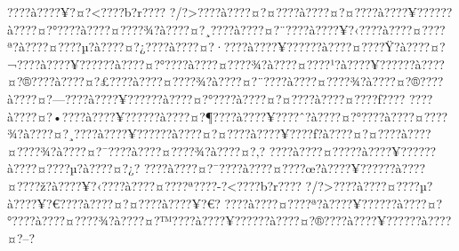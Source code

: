 \documentclass[11pt, openany]{book}
\begin{document}
{{{{{{{{{{{{{{{{{{{{{{{{{{{{{{{{{{{{{{{{{{{{{{{{{{{{{{{{{{{{{{{{{{{{{{{{{{{{{{{{{{{{{{{{{{{{{{{{{{{{{{{{{{{{{???\textbar{}?à???\textbar{}?¥?¤?\textless{}???\textbar{}?b?r???\textbar{}?
?/?\textgreater{}???\textbar{}?à???\textbar{}?¤?¤???\textbar{}?à???\textbar{}?¤?¤???\textbar{}?à???\textbar{}?¥?????\textbar{}?à???\textbar{}?¤?°???\textbar{}?à???\textbar{}?¤???\textbar{}?¾?à???\textbar{}?¤?¸???\textbar{}?à???\textbar{}?¤?¨???\textbar{}?à???\textbar{}?¥?‹???\textbar{}?à???\textbar{}?¤???\textbar{}?ª?à???\textbar{}?¤???\textbar{}?µ?à???\textbar{}?¤?¿???\textbar{}?à???\textbar{}?¤?·???\textbar{}?à???\textbar{}?¥?????\textbar{}?à???\textbar{}?¤???\textbar{}?Ÿ?à???\textbar{}?¤?¬???\textbar{}?à???\textbar{}?¥?????\textbar{}?à???\textbar{}?¤?°???\textbar{}?à???\textbar{}?¤???\textbar{}?¾?à???\textbar{}?¤???\textbar{}?¹?à???\textbar{}?¥?????\textbar{}?à???\textbar{}?¤?®???\textbar{}?à???\textbar{}?¤?£???\textbar{}?à???\textbar{}?¤???\textbar{}?¾?à???\textbar{}?¤?¨???\textbar{}?à???\textbar{}?¤???\textbar{}?¾?à???\textbar{}?¤?®???\textbar{}?à???\textbar{}?¤?---???\textbar{}?à???\textbar{}?¥?????\textbar{}?à???\textbar{}?¤?°???\textbar{}?à???\textbar{}?¤?¤???\textbar{}?à???\textbar{}?¤???\textbar{}?ƒ???\textbar{}?
???\textbar{}?à???\textbar{}?¤?•???\textbar{}?à???\textbar{}?¥?????\textbar{}?à???\textbar{}?¤?¶???\textbar{}?à???\textbar{}?¥???\textbar{}?ˆ?à???\textbar{}?¤?°???\textbar{}?à???\textbar{}?¤???\textbar{}?¾?à???\textbar{}?¤?¸???\textbar{}?à???\textbar{}?¥?????\textbar{}?à???\textbar{}?¤?¤???\textbar{}?à???\textbar{}?¥???\textbar{}?ƒ?à???\textbar{}?¤?¤???\textbar{}?à???\textbar{}?¤???\textbar{}?¾?à???\textbar{}?¤?¯???\textbar{}?à???\textbar{}?¤???\textbar{}?¾?à???\textbar{}?¤?‚?
???\textbar{}?à???\textbar{}?¤?­???\textbar{}?à???\textbar{}?¥?????\textbar{}?à???\textbar{}?¤???\textbar{}?µ?à???\textbar{}?¤?¿?
???\textbar{}?à???\textbar{}?¤?¯???\textbar{}?à???\textbar{}?¤???\textbar{}?œ?à???\textbar{}?¥?????\textbar{}?à???\textbar{}?¤???\textbar{}?ž?à???\textbar{}?¥?‹???\textbar{}?à???\textbar{}?¤???\textbar{}?ª???\textbar{}?-?\textless{}???\textbar{}?b?r???\textbar{}?
?/?\textgreater{}???\textbar{}?à???\textbar{}?¤???\textbar{}?µ?à???\textbar{}?¥?€???\textbar{}?à???\textbar{}?¤?¤???\textbar{}?à???\textbar{}?¥?€?
???\textbar{}?à???\textbar{}?¤???\textbar{}?ª?à???\textbar{}?¥?????\textbar{}?à???\textbar{}?¤?°???\textbar{}?à???\textbar{}?¤???\textbar{}?¾?à???\textbar{}?¤?™???\textbar{}?à???\textbar{}?¥?????\textbar{}?à???\textbar{}?¤?®???\textbar{}?à???\textbar{}?¥?????\textbar{}?à???\textbar{}?¤?--?
}}}}}}}}}}}}}}}}}}}}}}}}}}}}}}}}}}}}}}}}}}}}}}}}}}}}}}}}}}}}}}}}}}}}}}}}}}}}}}}}}}}}}}}}}}}}}}}}}}}}}}}}}}}}}
\end{document}
